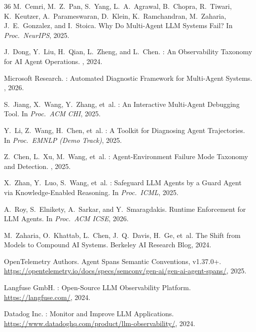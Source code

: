 \documentclass[sigplan,10pt,screen]{acmart}
\begin{document}
\begin{thebibliography}{36}
M.~Cemri, M.~Z.~Pan, S.~Yang, L.~A.~Agrawal, B.~Chopra, R.~Tiwari,
  K.~Keutzer, A.~Parameswaran, D.~Klein, K.~Ramchandran, M.~Zaharia,
  J.~E.~Gonzalez, and I.~Stoica.
\newblock Why Do Multi-Agent {LLM} Systems Fail?
\newblock In {\em Proc.\ NeurIPS}, 2025.

J.~Dong, Y.~Liu, H.~Qian, L.~Zheng, and L.~Chen.
: An Observability Taxonomy for {AI} Agent Operations.
, 2024.

{Microsoft Research}.
: Automated Diagnostic Framework for Multi-Agent Systems.
, 2026.

S.~Jiang, X.~Wang, Y.~Zhang, et~al.
: An Interactive Multi-Agent Debugging Tool.
\newblock In {\em Proc.\ ACM CHI}, 2025.

Y.~Li, Z.~Wang, H.~Chen, et~al.
: A Toolkit for Diagnosing Agent Trajectories.
\newblock In {\em Proc.\ EMNLP (Demo Track)}, 2025.

Z.~Chen, L.~Xu, M.~Wang, et~al.
: Agent-Environment Failure Mode Taxonomy and Detection.
, 2025.

X.~Zhan, Y.~Luo, S.~Wang, et~al.
: Safeguard {LLM} Agents by a Guard Agent via
  Knowledge-Enabled Reasoning.
\newblock In {\em Proc.\ ICML}, 2025.

A.~Roy, S.~Elnikety, A.~Sarkar, and Y.~Smaragdakis.
\newblock Runtime Enforcement for {LLM} Agents.
\newblock In {\em Proc.\ ACM ICSE}, 2026.

M.~Zaharia, O.~Khattab, L.~Chen, J.~Q.~Davis, H.~Ge, et~al.
\newblock The Shift from Models to Compound {AI} Systems.
\newblock Berkeley AI Research Blog, 2024.

{OpenTelemetry Authors}.
 Agent Spans Semantic Conventions, v1.37.0+.
\newblock \url{https://opentelemetry.io/docs/specs/semconv/gen-ai/gen-ai-agent-spans/}, 2025.

{Langfuse GmbH}.
: Open-Source {LLM} Observability Platform.
\newblock \url{https://langfuse.com/}, 2024.

{Datadog Inc.}
: Monitor and Improve {LLM} Applications.
\newblock \url{https://www.datadoghq.com/product/llm-observability/}, 2024.


\end{thebibliography}
\end{document}
